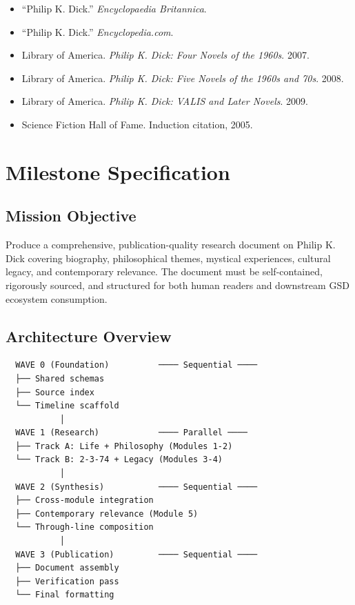\documentclass[11pt,letterpaper]{article}
\newcommand{\stageheader}[2]{%
  \noindent\colorbox{#2}{\makebox[\textwidth][l]{%
    \textcolor{white}{\bfseries\sffamily\hspace{6pt}#1\hspace{6pt}}}}%
  \vspace{0.5em}\par%
}
\begin{document}
\begin{itemize}[leftmargin=2em]
\item ``Philip K. Dick.'' \textit{Encyclopaedia Britannica}.
\item ``Philip K. Dick.'' \textit{Encyclopedia.com}.
\item Library of America. \textit{Philip K. Dick: Four Novels of the 1960s}. 2007.
\item Library of America. \textit{Philip K. Dick: Five Novels of the 1960s and 70s}. 2008.
\item Library of America. \textit{Philip K. Dick: VALIS and Later Novels}. 2009.
\item Science Fiction Hall of Fame. Induction citation, 2005.
\end{itemize}

\newpage

\stageheader{STAGE 3 --- MISSION PACKAGE}{tertiary}

\section{Milestone Specification}

\subsection{Mission Objective}

Produce a comprehensive, publication-quality research document on Philip K. Dick covering biography, philosophical themes, mystical experiences, cultural legacy, and contemporary relevance. The document must be self-contained, rigorously sourced, and structured for both human readers and downstream GSD ecosystem consumption.

\subsection{Architecture Overview}

\begin{asciibox}
\begin{verbatim}
  WAVE 0 (Foundation)          ──── Sequential ────
  ├── Shared schemas
  ├── Source index
  └── Timeline scaffold
           │
  WAVE 1 (Research)            ──── Parallel ────
  ├── Track A: Life + Philosophy (Modules 1-2)
  └── Track B: 2-3-74 + Legacy (Modules 3-4)
           │
  WAVE 2 (Synthesis)           ──── Sequential ────
  ├── Cross-module integration
  ├── Contemporary relevance (Module 5)
  └── Through-line composition
           │
  WAVE 3 (Publication)         ──── Sequential ────
  ├── Document assembly
  ├── Verification pass
  └── Final formatting
\end{verbatim}
\end{asciibox}
\end{document}
